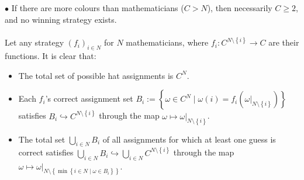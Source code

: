 \documentclass[11pt, a4paper, oneside]{article}
\theoremstyle{remark}
\theoremstyle{lemma}
\begin{document}
\(\bullet\) If there are more colours than mathematicians (\(C > N\)), then necessarily \(C \geq 2\), and no winning strategy exists.
\\\\
Let any strategy \(\left(f_i\right)_{i \in N}\) for \(N\) mathematicians, where \(f_i \colon C^{N \setminus \left\{i\right\}} \rightarrow C\) are their functions. It is clear that:
\begin{itemize}
    \item The total set of possible hat assignments is \(C^N\).
    \item Each \(f_i\)'s correct assignment set \(B_i := \left\{\omega \in C^N \mid \omega(i) = f_i\left(\left.\omega\right|_{N \setminus \left\{i\right\}}\right) \right\}\) satisfies \(B_i \hookrightarrow C^{N \setminus \left\{i\right\}}\) through the map \(\omega \mapsto \left.\omega\right|_{N \setminus \left\{i\right\}}\).
    \item The total set \(\bigcup_{i \in N} B_i\) of all assignments for which at least one guess is correct satisfies \(\bigcup_{i \in N} B_i \hookrightarrow \bigcup_{i \in N} C^{N \setminus \left\{i\right\}}\) through the map \(\omega \mapsto \left.\omega\right|_{N \setminus \left\{\min \left\{i \in N \mid \omega \in B_i\right\}\right\}}\).
\end{itemize}
\end{document}
